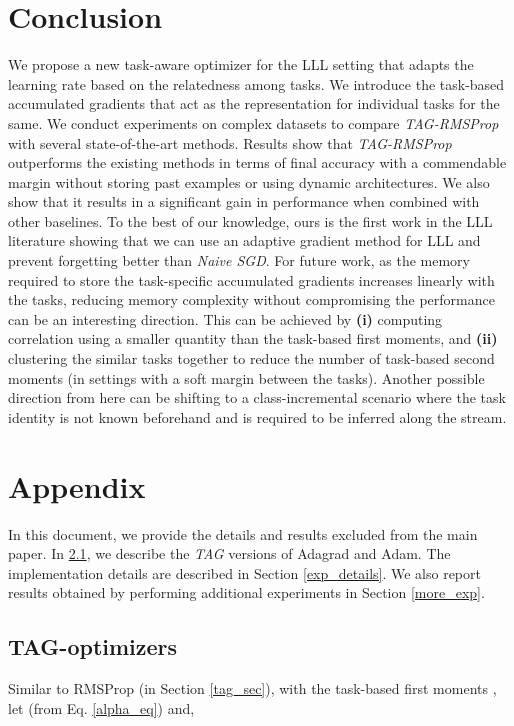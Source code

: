 \documentclass{article} \usepackage{collas2022_conference,times}
\begin{document}
\section{Conclusion}
We propose a new task-aware optimizer for the LLL setting that adapts the learning rate based on the relatedness among tasks. We introduce the task-based accumulated gradients that act as the representation for individual tasks for the same. We conduct experiments on complex datasets to compare \textit{TAG-RMSProp} with several state-of-the-art methods. Results show that \textit{TAG-RMSProp} outperforms the existing methods in terms of final accuracy with a commendable margin without storing past examples or using dynamic architectures. We also show that it results in a significant gain in performance when combined with other baselines. To the best of our knowledge, ours is the first work in the LLL literature showing that we can use an adaptive gradient method for LLL and prevent forgetting better than \textit{Naive SGD}. For future work, as the memory required to store the task-specific accumulated gradients increases linearly with the tasks, reducing memory complexity without compromising the performance can be an interesting direction. This can be achieved by \textbf{(i)} computing correlation using a smaller quantity than the task-based first moments, and \textbf{(ii)} clustering the similar tasks together to reduce the number of task-based second moments (in settings with a soft margin between the tasks). Another possible direction from here can be shifting to a class-incremental scenario where the task identity is not known beforehand and is required to be inferred along the stream.






\appendix
\section{Appendix}
In this document, we provide the details and results excluded from the main paper. In \ref{app_tag_opt}, we describe the \textit{TAG} versions of Adagrad and Adam. The implementation details are described in Section \ref{exp_details}. We also report results obtained by performing additional experiments in Section \ref{more_exp}. 

\subsection{TAG-optimizers}\label{app_tag_opt}
Similar to RMSProp (in Section \ref{tag_sec}), with the task-based first moments , let  (from Eq. \ref{alpha_eq}) and,
    
\end{document}
